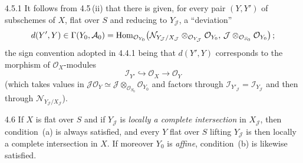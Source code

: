 \begin{remark}{4.5.1}
\label{III.4.5.1}
{\renewcommand{\thefootnote}{(85)}}
It follows from 4.5\,(ii) that there is given, for every pair \((Y,Y')\) of subschemes%
{\renewcommand{\thefootnote}{(86)}}
of \(X\), flat over \(S\) and reducing to \(Y_{\mathcal{J}}\), a ``deviation''
\[
d(Y',Y)\in\Gamma(Y_{0},\mathcal{A}_{0})
=
\operatorname{Hom}_{\mathcal{O}_{Y_{0}}}\bigl(\mathcal{N}_{Y_{\mathcal{J}}/X_{\mathcal{J}}}\otimes_{\mathcal{O}_{Y_{\mathcal{J}}}}\mathcal{O}_{Y_{0}},\,\mathcal{J}\otimes_{\mathcal{O}_{S_{0}}}\mathcal{O}_{Y_{0}}\bigr)\,;
\]
the sign convention adopted in 4.4.1 being that \(d(Y',Y)\) corresponds to the morphism of \(\mathcal{O}_{X}\)-modules
\[
\mathcal{I}_{Y'}\hookrightarrow\mathcal{O}_{X}\longrightarrow\mathcal{O}_{Y}
\]
(which takes values in \(\mathcal{J}\mathcal{O}_{Y}\simeq\mathcal{J}\otimes_{\mathcal{O}_{S_{0}}}\mathcal{O}_{Y_{0}}\) and factors through \(\mathcal{I}_{Y'_{\mathcal{J}}}=\mathcal{I}_{Y_{\mathcal{J}}}\) and then through \(\mathcal{N}_{Y_{\mathcal{J}}/X_{\mathcal{J}}}\)).
\end{remark}

\begin{remark}{4.6}
\label{III.4.6}
{\renewcommand{\thefootnote}{(87)}}
If \(X\) is flat over \(S\) and if \(Y_{\mathcal{J}}\) is \emph{locally a complete intersection} in \(X_{\mathcal{J}}\), then condition~(a) is always satisfied, and every \(Y\) flat over \(S\) lifting \(Y_{\mathcal{J}}\) is then locally a complete intersection in \(X\). If moreover \(Y_{0}\) is \emph{affine}, condition~(b) is likewise satisfied.
\end{remark}

